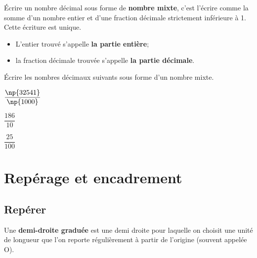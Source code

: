 \documentclass[a4paper]{book}
\begin{document}
    \begin{definition}
        Écrire un nombre décimal sous forme de \textbf{nombre mixte}, c'est l'écrire comme la somme d'un nombre entier et d'une fraction décimale strictement inférieure à 1. Cette écriture est unique.

        \begin{itemize}
            \item L'entier trouvé s'appelle \textbf{la partie entière};
            \item la fraction décimale trouvée s'appelle \textbf{la partie décimale}.
        \end{itemize}
    \end{definition}


    \begin{exemple}
        Écrire les nombres décimaux suivants sous forme d'un nombre mixte.
        
        \medskip

        \begin{minipage}{0.30\linewidth}
            $\dfrac{\np{32541}}{\np{1000}}$
            
            \vspace{2cm}
        \end{minipage}
        \hfill\vline\hfill
        \begin{minipage}{0.30\linewidth}
            $\dfrac{186}{10}$
            
            \vspace{2cm}
        \end{minipage}
        \hfill\vline\hfill
        \begin{minipage}{0.30\linewidth}
            $\dfrac{25}{100}$
            
            \vspace{2cm}
        \end{minipage}
    \end{exemple}


\section{Repérage et encadrement}
\subsection{Repérer}
    \begin{definition}
        Une \textbf{demi-droite graduée} est une demi droite pour laquelle on choisit une unité de longueur que l'on reporte régulièrement à partir de l'origine (souvent appelée O).
    \end{definition}
    
\end{document}

